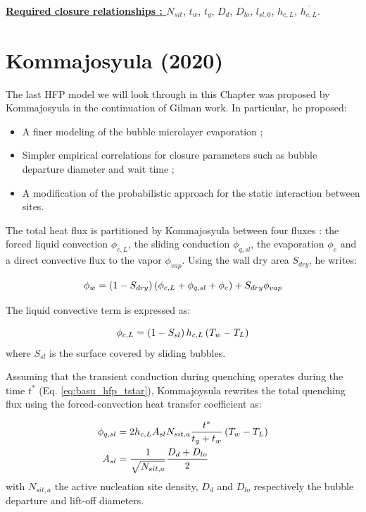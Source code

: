 \npar

\textbf{\underline{Required closure relationships : }} $N_{sit}$, $t_{w}$, $t_{g}$, $D_{d}$, $D_{lo}$, $l_{sl,0}$, $h_{c,L}$, $\overline{h_{c,L}}$. 



\section{Kommajosyula (2020)}
\label{sec:hfp_komma}

The last HFP model we will look through in this Chapter was proposed by Kommajosyula \cite{kommajosyula_development_2020} in the continuation of Gilman \cite{gilman_phd} work. In particular, he proposed:

\begin{itemize}
\item A finer modeling of the bubble microlayer evaporation ;
\item Simpler empirical correlations for closure parameters such as bubble departure diameter and wait time ;
\item A modification of the probabilistic approach for the static interaction between sites.
\end{itemize}

The total heat flux is partitioned by Kommajosyula between four fluxes : the forced liquid convection $\phi_{c,L}$, the sliding conduction $\phi_{q,sl}$, the evaporation $\phi_{e}$ and a direct convective flux to the vapor $\phi_{vap}$. Using the wall dry area $S_{dry}$, he writes:

\begin{equation}
\phi_{w} = \left( 1-S_{dry} \right)\left( \phi_{c,L} + \phi_{q,sl} + \phi_{e} \right) + S_{dry} \phi_{vap}
\end{equation}

The liquid convective term is expressed as:

\begin{equation}
\phi_{c,L} = \left( 1-S_{sl} \right)h_{c,L}\left( T_{w} - T_{L} \right)
\end{equation}
where $S_{sl}$ is the surface covered by sliding bubbles.

\npar

Assuming that the transient conduction during quenching operates during the time $t^{*}$ (Eq. \ref{eq:basu_hfp_tstar}), Kommajoysula rewrites the total quenching flux using the forced-convection heat transfer coefficient as:

\begin{align}
\phi_{q,sl} &= 2 h_{c,L} A_{sl} N_{sit,a} \frac{t^{*}}{t_{g}+t_{w}}\left( T_{w}-T_{L} \right)\\
A_{sl} &= \dfrac{1}{\sqrt{N_{sit,a}}} \frac{D_{d} + D_{lo}}{2}
\end{align}
with $N_{sit,a}$ the active nucleation site density, $D_{d}$ and $D_{lo}$ respectively the bubble departure and lift-off diameters.

